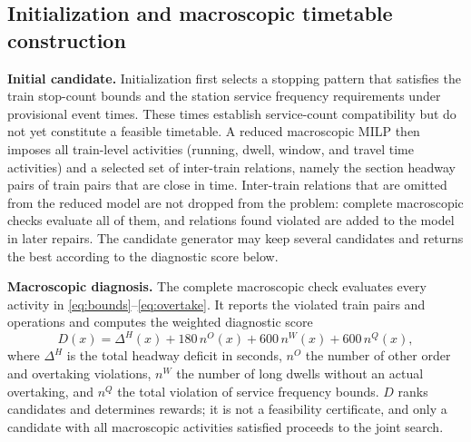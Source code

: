 \subsection{Initialization and macroscopic timetable construction}\label{sec:init}
\textbf{Initial candidate.} Initialization first selects a stopping pattern that satisfies the train stop-count bounds and the station service frequency requirements under provisional event times. These times establish service-count compatibility but do not yet constitute a feasible timetable. A reduced macroscopic MILP then imposes all train-level activities (running, dwell, window, and travel time activities) and a selected set of inter-train relations, namely the section headway pairs of train pairs that are close in time. Inter-train relations that are omitted from the reduced model are not dropped from the problem: complete macroscopic checks evaluate all of them, and relations found violated are added to the model in later repairs. The candidate generator may keep several candidates and returns the best according to the diagnostic score below.

\textbf{Macroscopic diagnosis.} The complete macroscopic check evaluates every activity in \eqref{eq:bounds}--\eqref{eq:overtake}. It reports the violated train pairs and operations and computes the weighted diagnostic score
\begin{equation}
D(x)=\Delta^{H}(x)+180\,n^{O}(x)+600\,n^{W}(x)+600\,n^{Q}(x),\label{eq:diag}
\end{equation}
where $\Delta^H$ is the total headway deficit in seconds, $n^O$ the number of other order and overtaking violations, $n^W$ the number of long dwells without an actual overtaking, and $n^Q$ the total violation of service frequency bounds. $D$ ranks candidates and determines rewards; it is not a feasibility certificate, and only a candidate with all macroscopic activities satisfied proceeds to the joint search.

